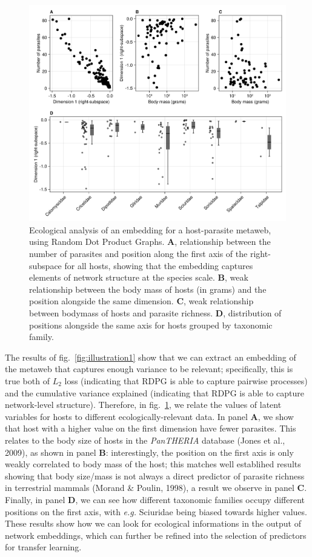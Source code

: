 \documentclass[10pt,oneside]{article}
\makeatletter
\def\maxwidth{\ifdim\Gin@nat@width>\linewidth\linewidth
\else\Gin@nat@width\fi}
\let\Oldincludegraphics\includegraphics
\renewcommand{\includegraphics}[1]{\Oldincludegraphics[width=\maxwidth]{#1}}
\makeatother
\begin{document}
\begin{figure}
\hypertarget{fig:illustration2}{%
\centering
\includegraphics{figures/illustration-part2.png}
\caption{Ecological analysis of an embedding for a host-parasite
metaweb, using Random Dot Product Graphs. \textbf{A}, relationship
between the number of parasites and position along the first axis of the
right-subspace for all hosts, showing that the embedding captures
elements of network structure at the species scale. \textbf{B}, weak
relationship between the body mass of hosts (in grams) and the position
alongside the same dimension. \textbf{C}, weak relationship between
bodymass of hosts and parasite richness. \textbf{D}, distribution of
positions alongside the same axis for hosts grouped by taxonomic
family.}\label{fig:illustration2}
}
\end{figure}

The results of fig.~\ref{fig:illustration1} show that we can extract an
embedding of the metaweb that captures enough variance to be relevant;
specifically, this is true both of \(L_2\) loss (indicating that RDPG is
able to capture pairwise processes) and the cumulative variance
explained (indicating that RDPG is able to capture network-level
structure). Therefore, in fig.~\ref{fig:illustration2}, we relate the
values of latent variables for hosts to different ecologically-relevant
data. In panel \textbf{A}, we show that host with a higher value on the
first dimension have fewer parasites. This relates to the body size of
hosts in the \emph{PanTHERIA} database (Jones et al., 2009), as shown in
panel \textbf{B}: interestingly, the position on the first axis is only
weakly correlated to body mass of the host; this matches well establihed
results showing that body size/mass is not always a direct predictor of
parasite richness in terrestrial mammals (Morand \& Poulin, 1998), a
result we observe in panel \textbf{C}. Finally, in panel \textbf{D}, we
can see how different taxonomic families occupy different positions on
the first axis, with \emph{e.g.} Sciuridae being biased towards higher
values. These results show how we can look for ecological informations
in the output of network embeddings, which can further be refined into
the selection of predictors for transfer learning.
\end{document}
